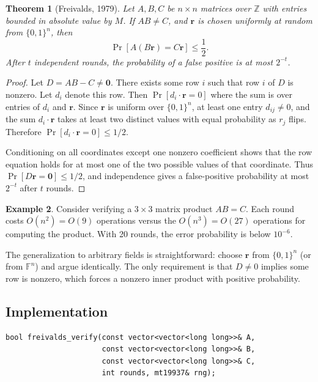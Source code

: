 \documentclass[twoside,12pt]{book}
\theoremstyle{plain}
\newtheorem{theorem}{Theorem}[chapter]
\theoremstyle{definition}
\newtheorem{example}[theorem]{Example}
\theoremstyle{remark}
\newenvironment{cpplisting}{\begin{center}\small}{\end{center}}
\begin{document}
\begin{theorem}[Freivalds, 1979]
\label{thm:freivalds}
Let $A, B, C$ be $n \times n$ matrices over $\mathbb{Z}$ with entries bounded in absolute value by $M$. If $AB \neq C$, and $\mathbf{r}$ is chosen uniformly at random from $\{0, 1\}^n$, then
\[
\Pr[A(B\mathbf{r}) = C\mathbf{r}] \leq \frac{1}{2}.
\]
After $t$ independent rounds, the probability of a false positive is at most $2^{-t}$.
\end{theorem}

\begin{proof}
Let $D = AB - C \neq \mathbf{0}$. There exists some row $i$ such that row $i$ of $D$ is nonzero. Let $d_i$ denote this row. Then $\Pr[d_i \cdot \mathbf{r} = 0]$ where the sum is over entries of $d_i$ and $\mathbf{r}$. Since $\mathbf{r}$ is uniform over $\{0,1\}^n$, at least one entry $d_{ij} \neq 0$, and the sum $d_i \cdot \mathbf{r}$ takes at least two distinct values with equal probability as $r_j$ flips. Therefore $\Pr[d_i \cdot \mathbf{r} = 0] \leq 1/2$.

Conditioning on all coordinates except one nonzero coefficient shows that
the row equation holds for at most one of the two possible values of that
coordinate. Thus $\Pr[D\mathbf r=\mathbf 0]\leq 1/2$, and independence gives
a false-positive probability at most $2^{-t}$ after $t$ rounds.
\end{proof}

\begin{example}
\label{ex:freivalds}
Consider verifying a $3 \times 3$ matrix product $AB = C$. Each round costs $O(n^2) = O(9)$ operations versus the $O(n^3) = O(27)$ operations for computing the product. With 20 rounds, the error probability is below $10^{-6}$.
\end{example}

The generalization to arbitrary fields is straightforward: choose $\mathbf{r}$ from $\{0, 1\}^n$ (or from $\mathbb{F}^n$) and argue identically. The only requirement is that $D \neq 0$ implies some row is nonzero, which forces a nonzero inner product with positive probability.

\subsection*{Implementation}

\begin{cpplisting}
\begin{lstlisting}[title={Freivalds' algorithm --- \texttt{src/chapter8/freivalds.h}}]
bool freivalds_verify(const vector<vector<long long>>& A,
                      const vector<vector<long long>>& B,
                      const vector<vector<long long>>& C,
                      int rounds, mt19937& rng);
\end{lstlisting}
\end{cpplisting}
\end{document}
